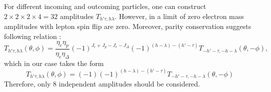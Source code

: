\documentclass[12pt]{revtex4-1}
\begin{document}
	For different incoming and outcoming particles, one can construct
	$2 \times 2 \times 2 \times 4 = 32$ amplitudes $T_{h' \tau, h \lambda}$.
	However, in a limit of zero electron mass amplitudes with lepton 
	spin flip are zero. Moreover, parity conservation suggests following
	relation \cite{bib:leader}:
	\begin{equation*}
		T_{h' \tau, h \lambda}(\theta, \phi) 
		= \frac{\eta_e \eta_p}{\eta_e \eta_\Delta}
		(-1)^{J_e + J_p - J_e - J_\Delta} (-1)^{(h - \lambda) - (h' - \tau)}
		T_{-h' -\tau, -h -\lambda} (\theta,-\phi) ,
	\end{equation*}
	which in our case takes the form
	\begin{equation}
		T_{h' \tau, h \lambda}(\theta, \phi) 
		=
		(-1) (-1)^{(h - \lambda) - (h' - \tau)}
		T_{-h' -\tau, -h -\lambda} (\theta,-\phi) 
	\end{equation}
	Therefore, only $8$ independent amplitudes should be considered.
	
\end{document}
